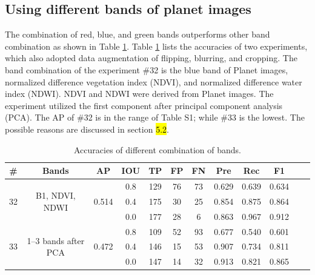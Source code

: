 \documentclass[preprint,12pt,authoryear]{elsarticle}
\begin{document}
\subsection{Using different bands of planet images}
\label{subsub_otherbands}

The combination of red, blue, and green bands outperforms other band combination as shown in Table \ref{table_acc_otherbands}. Table \ref{table_acc_otherbands} lists the accuracies of two experiments, which also adopted data augmentation of flipping, blurring, and cropping. The band combination of the experiment \#32 is the blue band of Planet images, normalized difference vegetation index (NDVI), and normalized difference water index (NDWI).  NDVI and NDWI were derived from Planet images. The experiment utilized the first component after principal component analysis (PCA). The AP of \#32 is in the range of Table S1; while \#33 is the lowest. The possible reasons are discussed in section \hl{5.2}.

\begin{table}[ht]
\footnotesize
\caption{Accuracies of different combination of bands.}
\label{table_acc_otherbands}
\begin{tabular}{c c c c  c ccc c c c c}
\toprule
\textbf{\#}&\textbf{Bands}&\textbf{AP}&\textbf{IOU}&\textbf{TP}&\textbf{FP}&\textbf{FN}&\textbf{Pre}&\textbf{Rec}&\textbf{F1}\\
\midrule

\multirow{3}{*}{32} &  \multirow{3}{*}{B1, NDVI, NDWI} & \multirow{3}{*}{0.514}  &0.8&129&76&73&0.629 &0.639 &0.634   \\
 &  &  &0.4&175&30&25&0.854 &0.875 &0.864  \\
 &  &  &0.0&177&28&6&0.863 &0.967 &0.912   \\

\multirow{3}{*}{33} &  \multirow{3}{*}{1--3 bands after PCA} & \multirow{3}{*}{0.472} &0.8&109&52&93&0.677 &0.540 &0.601  \\
 &  &  &0.4&146&15&53&0.907 &0.734 &0.811  \\
 &  & &0.0&147&14&32&0.913 &0.821 &0.865  \\

\bottomrule
\end{tabular}
\end{table}
\end{document}
